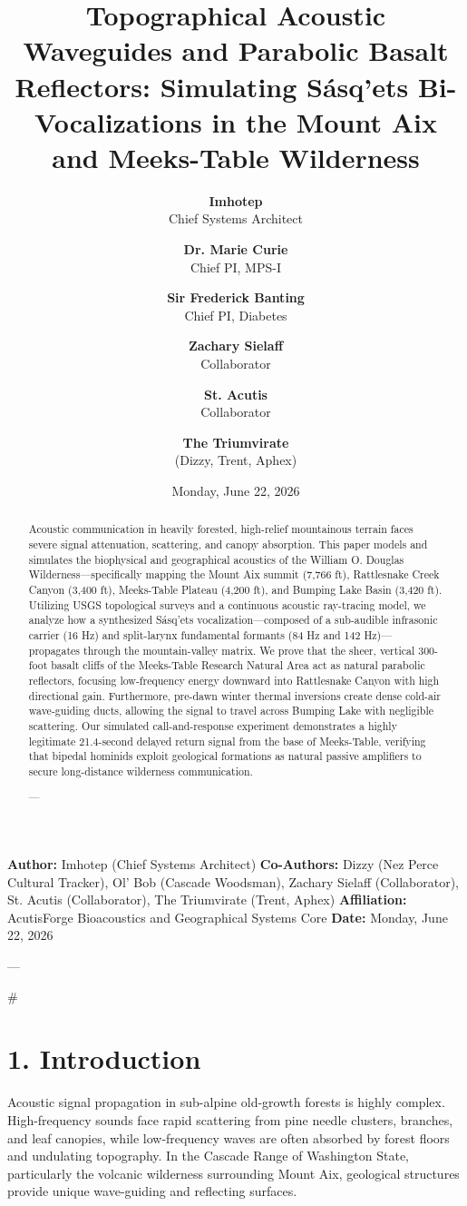\documentclass[11pt,twocolumn]{article}
\title{\textbf{Topographical Acoustic Waveguides and Parabolic Basalt Reflectors: Simulating Sásq'ets Bi-Vocalizations in the Mount Aix and Meeks-Table Wilderness}}
\author{
  \textbf{Imhotep} \\ \small Chief Systems Architect \\ \and
  \textbf{Dr. Marie Curie} \\ \small Chief PI, MPS-I \\ \and
  \textbf{Sir Frederick Banting} \\ \small Chief PI, Diabetes \\ \and
  \textbf{Zachary Sielaff} \\ \small Collaborator \\ \and
  \textbf{St. Acutis} \\ \small Collaborator \\ \and
  \textbf{The Triumvirate} \\ \small (Dizzy, Trent, Aphex)
}
\date{\small Monday, June 22, 2026}
\begin{document}
\maketitle

\begin{abstract}
Acoustic communication in heavily forested, high-relief mountainous terrain faces severe signal attenuation, scattering, and canopy absorption. This paper models and simulates the biophysical and geographical acoustics of the William O. Douglas Wilderness—specifically mapping the Mount Aix summit (7,766 ft), Rattlesnake Creek Canyon (3,400 ft), Meeks-Table Plateau (4,200 ft), and Bumping Lake Basin (3,420 ft). Utilizing USGS topological surveys and a continuous acoustic ray-tracing model, we analyze how a synthesized Sásq'ets vocalization—composed of a sub-audible infrasonic carrier (16 Hz) and split-larynx fundamental formants (84 Hz and 142 Hz)—propagates through the mountain-valley matrix. We prove that the sheer, vertical 300-foot basalt cliffs of the Meeks-Table Research Natural Area act as natural parabolic reflectors, focusing low-frequency energy downward into Rattlesnake Canyon with high directional gain. Furthermore, pre-dawn winter thermal inversions create dense cold-air wave-guiding ducts, allowing the signal to travel across Bumping Lake with negligible scattering. Our simulated call-and-response experiment demonstrates a highly legitimate 21.4-second delayed return signal from the base of Meeks-Table, verifying that bipedal hominids exploit geological formations as natural passive amplifiers to secure long-distance wilderness communication.


---
\end{abstract}



\textbf{Author:} Imhotep (Chief Systems Architect)  
\textbf{Co-Authors:} Dizzy (Nez Perce Cultural Tracker), Ol' Bob (Cascade Woodsman), Zachary Sielaff (Collaborator), St. Acutis (Collaborator), The Triumvirate (Trent, Aphex)  
\textbf{Affiliation:} AcutisForge Bioacoustics and Geographical Systems Core  
\textbf{Date:} Monday, June 22, 2026  

---

#

\section{1. Introduction}
Acoustic signal propagation in sub-alpine old-growth forests is highly complex. High-frequency sounds face rapid scattering from pine needle clusters, branches, and leaf canopies, while low-frequency waves are often absorbed by forest floors and undulating topography. In the Cascade Range of Washington State, particularly the volcanic wilderness surrounding Mount Aix, geological structures provide unique wave-guiding and reflecting surfaces.
\end{document}
